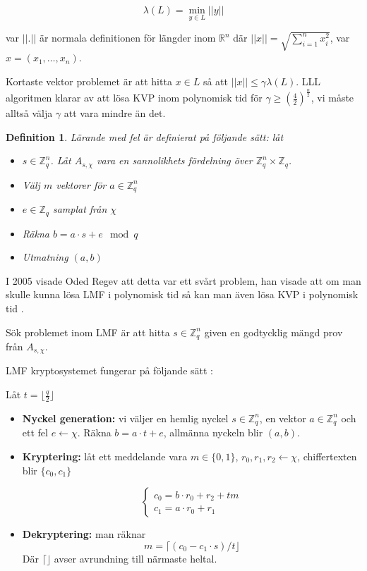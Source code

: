 \documentclass{paper}
\newtheorem{definition}{Definition}
\newcommand{\bR}{\mathbb{R}}
\newcommand{\bZ}{\mathbb{Z}}
\begin{document}
\[\lambda (L) = \min_{y \in L} ||y||\]

var $||.||$ är normala definitionen för längder inom $\bR^n$ där $||x|| =
\sqrt{\sum_{i = 1}^n x_i^2}$, var $x = (x_1, \ldots, x_n)$.


Kortaste vektor problemet är att hitta $x \in L$ så att $||x|| \leq \gamma
\lambda (L)$. LLL algoritmen klarar av att lösa KVP inom polynomisk tid för
$\gamma \geq (\frac{4}{2})^{\frac{n}{2}}$, vi måste alltså välja $\gamma$ att
vara mindre än det.

\begin{definition}
    Lärande med fel är definierat på följande sätt: låt
    \begin{itemize}
        \item $s \in \bZ^n_q$. Låt $A_{s,\chi}$ vara en sannolikhets fördelning
            över $\bZ^n_q \times \bZ_q$.
        \item Välj $m$ vektorer för $a \in \bZ^n_q$
        \item $e \in \bZ_q$ samplat från $\chi$
        \item Räkna $b = a \cdot s + e \mod q$

        \item Utmatning $(a,b)$
    \end{itemize}
\end{definition}

I 2005 visade Oded Regev att detta var ett svårt problem, han visade att om man
skulle kunna lösa LMF i polynomisk tid så kan man även lösa KVP i polynomisk
tid \citep{regev05}.

Sök problemet inom LMF är att hitta $s \in \bZ^n_q$ given en godtycklig mängd
prov från $A_{s, \chi}$.

LMF kryptosystemet fungerar på följande sätt \citep{FPGA_post_quantum}:

Låt $t = \lfloor \frac{q}{2} \rfloor$
\begin{itemize}
    \item \textbf{Nyckel generation:} vi väljer en hemlig nyckel
        $s \in \bZ^n_q$, en vektor $a \in \bZ^n_q$ och ett fel $e \leftarrow
        \chi$. Räkna $b = a \cdot t + e$, allmänna nyckeln blir $(a,b)$.

    \item \textbf{Kryptering:} låt ett meddelande vara $m \in \{0,1\}$, $r_0,
        r_1, r_2 \leftarrow \chi$, chiffertexten blir $\{c_0, c_1\}$

        \[
            \begin{cases}
                c_0 = b \cdot r_0 + r_2 + t m\\
                c_1 = a \cdot r_0 + r_1
            \end{cases}
        \]

    \item \textbf{Dekryptering:} man räknar
        \[m = \lceil (c_0 - c_1 \cdot s) / t \rfloor \]
        Där $\lceil \rfloor$ avser avrundning till närmaste heltal.
\end{itemize}
\end{document}
